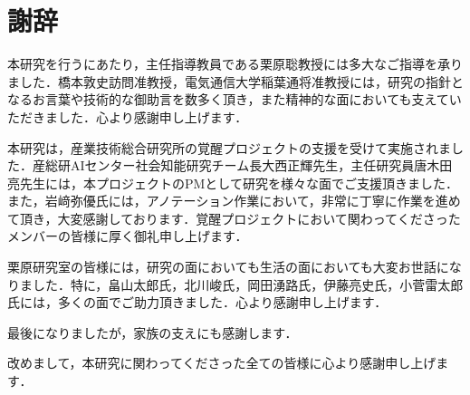 \documentclass[a4j,12pt,dvipdfmx]{jsreport}
\begin{document}
\ifdefined\ismain\else
  \pagestyle{fancy}
  \lhead{\rightmark}
  \renewcommand{\chaptermark}[1]{\markboth{第\ \thechapter\ 章\ #1}{}}
  \setlength{\headheight}{16.5pt}
  \titleformat{\chapter}[hang]{\LARGE\bfseries}{\prechaptername\thechapter\postchaptername}{1em}{}
\fi

\chapter*{謝辞}
本研究を行うにあたり，主任指導教員である栗原聡教授には多大なご指導を承りました．橋本敦史訪問准教授，電気通信大学稲葉通将准教授には，研究の指針となるお言葉や技術的な御助言を数多く頂き，また精神的な面においても支えていただきました．心より感謝申し上げます．

本研究は，産業技術総合研究所の覚醒プロジェクトの支援を受けて実施されました．産総研AIセンター社会知能研究チーム長大西正輝先生，主任研究員唐木田亮先生には，本プロジェクトのPMとして研究を様々な面でご支援頂きました．また，岩﨑弥優氏には，アノテーション作業において，非常に丁寧に作業を進めて頂き，大変感謝しております．覚醒プロジェクトにおいて関わってくださったメンバーの皆様に厚く御礼申し上げます．

栗原研究室の皆様には，研究の面においても生活の面においても大変お世話になりました．特に，畠山太郎氏，北川峻氏，岡田湧路氏，伊藤亮史氏，小菅雷太郎氏には，多くの面でご助力頂きました．心より感謝申し上げます．

最後になりましたが，家族の支えにも感謝します．

改めまして，本研究に関わってくださった全ての皆様に心より感謝申し上げます．


\ifdefined\ismain\else
  \printbibliography[title=参考文献]
\fi
\end{document}
